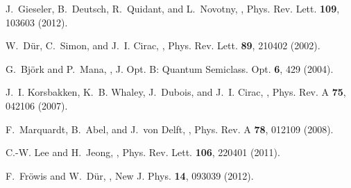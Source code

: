 \documentclass[12pt]{article}
\begin{document}
\begin{thebibliography}{100}
J.~Gieseler, B.~Deutsch, R.~Quidant, and L.~Novotny,
,
\newblock Phys. Rev. Lett. {\bf 109}, 103603 (2012).

W.~D\"ur, C.~Simon, and J.~I. Cirac,
,
\newblock Phys. Rev. Lett. {\bf 89}, 210402 (2002).

G.~Bj{\"o}rk and P.~Mana,
,
\newblock J. Opt. B: Quantum Semiclass. Opt. {\bf 6}, 429 (2004).

J.~I. Korsbakken, K.~B. Whaley, J.~Dubois, and J.~I. Cirac,
,
\newblock Phys. Rev. A {\bf 75}, 042106 (2007).

F.~Marquardt, B.~Abel, and J.~von Delft,
,
\newblock Phys. Rev. A {\bf 78}, 012109 (2008).

C.-W. Lee and H.~Jeong,
,
\newblock Phys. Rev. Lett. {\bf 106}, 220401 (2011).

F.~Fr\"{o}wis and W.~D\"{u}r,
,
\newblock New J. Phys. {\bf 14}, 093039 (2012).

\end{thebibliography}
\end{document}
